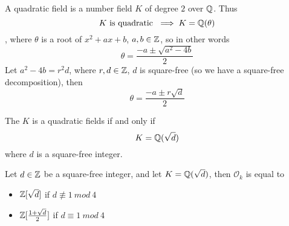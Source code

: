 \begin{definition}
A quadratic field is a number field $K$ of degree $2$ over $\mathbb{Q}$. Thus
\[K \text{ is quadratic } \implies K = \mathbb{Q}(\theta)\]
, where $\theta$ is a root of $x^2 + ax + b$, $a, b \in \mathbb{Z}$, so in other words
\[\theta = \frac{-a \pm \sqrt{a^2 - 4b}}{2}\]
Let $a^2 - 4b = r^2 d$, where $r, d \in \mathbb{Z}$, $d$ is square-free (so we have a square-free decomposition), then
\[\theta = \frac{-a \pm r \sqrt{d}}{2}\]
\end{definition}

\begin{proposition}[p.64 of ST]
The $K$ is a quadratic fields if and only if
\[K = \mathbb{Q}(\sqrt{d})\]
where $d$ is a square-free integer.
\end{proposition}

\begin{theorem}[p.64 of ST]
Let $d \in \mathbb{Z}$ be a square-free integer, and let $K = \mathbb{Q}(\sqrt{d})$, then $\mathcal{O}_k$ is equal to
\begin{itemize}
    \item $\mathbb{Z}[\sqrt{d}]$ if $d \not \equiv 1\ mod\ 4$
    \item $\mathbb{Z}[\frac{1 + \sqrt{d}}{2}]$ if $d \equiv 1\ mod\ 4$
\end{itemize}
\end{theorem}
